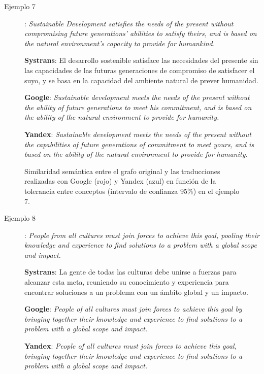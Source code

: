 \documentclass[a4paper,12pt,spanish]{book}
\begin{document}
\begin{description}
\item[{Ejemplo 7}] \leavevmode
: \emph{Sustainable Development satisfies the needs of the present without compromising future generations' abilities to satisfy theirs, and is based on the natural environment's capacity to provide for humankind.}

\textbf{Systrans}: El desarrollo sostenible satisface las necesidades del presente sin las capacidades de las futuras generaciones de compromiso de satisfacer el suyo, y se basa en la capacidad del ambiente natural de prever humanidad.

\textbf{Google}: \emph{Sustainable development meets the needs of the present without the ability of future generations to meet his commitment, and is based on the ability of the natural environment to provide for humanity.}

\textbf{Yandex}: \emph{Sustainable development meets the needs of the present without the capabilities of future generations of commitment to meet yours, and is based on the ability of the natural environment to provide for humanity.}

\end{description}
\begin{figure}[htbp]
\centering
\capstart

\caption{Similaridad semántica entre el grafo original y las traducciones realizadas con Google (rojo) y Yandex (azul) en función de la tolerancia entre conceptos (intervalo de confianza 95\%) en el ejemplo 7.}\label{5.pruebas/index:sample07-relation-tol-0}\end{figure}
\begin{description}
\item[{Ejemplo 8}] \leavevmode
: \emph{People from all cultures must join forces to achieve this goal, pooling their knowledge and experience to find solutions to a problem with a global scope and impact.}

\textbf{Systrans}: La gente de todas las culturas debe unirse a fuerzas para alcanzar esta meta, reuniendo su conocimiento y experiencia para encontrar soluciones a un problema con un ámbito global y un impacto.

\textbf{Google}: \emph{People of all cultures must join forces to achieve this goal by bringing together their knowledge and experience to find solutions to a problem with a global scope and impact.}

\textbf{Yandex}: \emph{People of all cultures must join forces to achieve this goal, bringing together their knowledge and experience to find solutions to a problem with a global scope and impact.}

\end{description}
\end{document}
